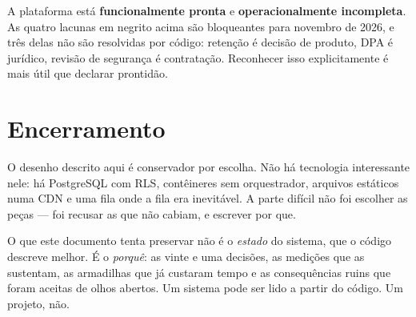 \begin{limitacao}
A plataforma está \textbf{funcionalmente pronta} e \textbf{operacionalmente
incompleta}. As quatro lacunas em negrito acima são bloqueantes para novembro de
2026, e três delas não são resolvidas por código: retenção é decisão de produto,
DPA é jurídico, revisão de segurança é contratação. Reconhecer isso explicitamente
é mais útil que declarar prontidão.
\end{limitacao}

\section{Encerramento}

O desenho descrito aqui é conservador por escolha. Não há tecnologia interessante
nele: há PostgreSQL com RLS, contêineres sem orquestrador, arquivos estáticos numa
CDN e uma fila onde a fila era inevitável. A parte difícil não foi escolher as
peças --- foi recusar as que não cabiam, e escrever por que.

O que este documento tenta preservar não é o \emph{estado} do sistema, que o
código descreve melhor. É o \emph{porquê}: as vinte e uma decisões, as medições
que as sustentam, as armadilhas que já custaram tempo e as consequências ruins que
foram aceitas de olhos abertos. Um sistema pode ser lido a partir do código. Um
projeto, não.
